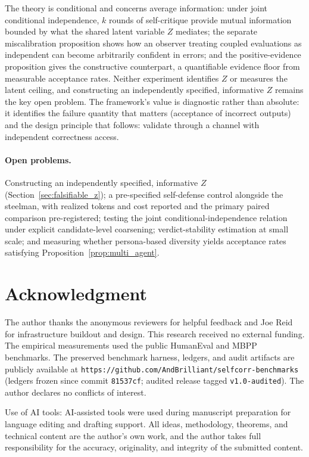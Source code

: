 \documentclass[a4paper,journal]{IAENGtran}
\begin{document}
The theory is conditional and concerns average information: under joint conditional
independence, $k$ rounds of self-critique provide mutual information bounded by what
the shared latent variable $Z$ mediates; the separate miscalibration proposition shows
how an observer treating coupled evaluations as independent can become arbitrarily
confident in errors; and the positive-evidence proposition gives the constructive counterpart,
a quantifiable evidence floor from measurable acceptance rates. Neither experiment
identifies $Z$ or measures the latent ceiling, and constructing an independently
specified, informative $Z$ remains the key open problem. The framework's value is
diagnostic rather than absolute: it identifies the failure quantity that matters (acceptance
of incorrect outputs) and the design principle that follows: validate through a channel with independent
correctness access.

\paragraph{Open problems.} Constructing an independently specified, informative $Z$
(Section~\ref{sec:falsifiable_z}); a pre-specified self-defense control alongside the
steelman, with realized tokens and cost reported and the primary paired comparison
pre-registered; testing the joint conditional-independence relation under explicit
candidate-level coarsening; verdict-stability estimation at small scale; and measuring
whether persona-based diversity yields acceptance rates satisfying
Proposition~\ref{prop:multi_agent}.

\section*{Acknowledgment}
The author thanks the anonymous reviewers for helpful feedback and Joe Reid for
infrastructure buildout and design. This research received no external funding. The
empirical measurements used the public HumanEval and MBPP benchmarks. The preserved
benchmark harness, ledgers, and audit artifacts are publicly available at
\texttt{https://github.com/\allowbreak AndBrilliant/\allowbreak selfcorr-benchmarks}
(ledgers frozen since commit \texttt{81537cf}; audited release tagged \texttt{v1.0-audited}). The author declares no conflicts of interest.

Use of AI tools: AI-assisted tools were used during manuscript preparation for language
editing and drafting support. All ideas, methodology, theorems, and technical content
are the author's own work, and the author takes full responsibility for the accuracy,
originality, and integrity of the submitted content.
\end{document}
